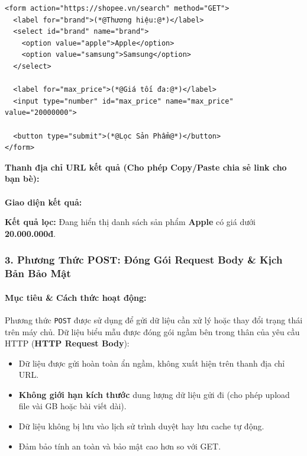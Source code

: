\documentclass[11pt,oneside]{book}
\newcommand{\codeinline}[1]{\textcolor{accentOrange}{\texttt{#1}}}
\newcommand{\term}[1]{\textbf{\textcolor{primaryBlue}{#1}}}
\begin{document}
\begin{codeWindow}
\begin{lstlisting}[language=HTML5]
<form action="https://shopee.vn/search" method="GET">
  <label for="brand">(*@Thương hiệu:@*)</label>
  <select id="brand" name="brand">
    <option value="apple">Apple</option>
    <option value="samsung">Samsung</option>
  </select>

  <label for="max_price">(*@Giá tối đa:@*)</label>
  <input type="number" id="max_price" name="max_price" value="20000000">

  <button type="submit">(*@Lọc Sản Phẩm@*)</button>
</form>
\end{lstlisting}
\end{codeWindow}

\begin{browserWindow}
\sffamily\small
\textbf{Thanh địa chỉ URL kết quả (Cho phép Copy/Paste chia sẻ link cho bạn bè):} \\[3pt]
 \\[8pt]
\textbf{Giao diện kết quả:} \\[4pt]
\begin{tcolorbox}[colback=white, colframe=primaryBlue!20, arc=4pt, boxrule=0.6pt, left=8pt, right=8pt, top=6pt, bottom=6pt]
  \textcolor{darkText}{\textbf{Kết quả lọc:}} Đang hiển thị danh sách sản phẩm \textbf{Apple} có giá dưới \textbf{20.000.000đ}.
\end{tcolorbox}
\end{browserWindow}

\subsubsection{3. Phương Thức POST: Đóng Gói Request Body \& Kịch Bản Bảo Mật}

\paragraph{Mục tiêu \& Cách thức hoạt động:}
Phương thức \codeinline{POST} được sử dụng để gửi dữ liệu cần xử lý hoặc thay đổi trạng thái trên máy chủ. Dữ liệu biểu mẫu được đóng gói ngầm bên trong thân của yêu cầu HTTP (\term{HTTP Request Body}):
\begin{itemize}[leftmargin=1.8em, itemsep=3pt, parsep=0pt]
    \item Dữ liệu được gửi hoàn toàn ẩn ngầm, không xuất hiện trên thanh địa chỉ URL.
    \item \textbf{Không giới hạn kích thước} dung lượng dữ liệu gửi đi (cho phép upload file vài GB hoặc bài viết dài).
    \item Dữ liệu không bị lưu vào lịch sử trình duyệt hay lưu cache tự động.
    \item Đảm bảo tính an toàn và bảo mật cao hơn so với GET.
\end{itemize}
\end{document}
